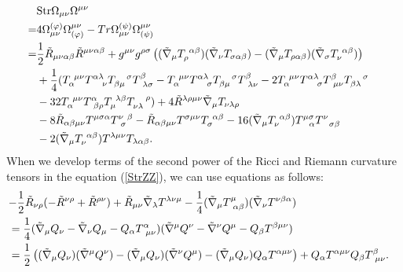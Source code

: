 \begin{align}
\lefteqn{{\rm Str}\Omega_{\mu\nu}\Omega^{\mu\nu}} \nonumber \\
= &
4\Omega^{(\varphi)}_{\mu\nu}\Omega_{(\varphi)}^{\mu\nu}-Tr \Omega_{\mu\nu}^{(\psi)}\Omega^{\mu\nu}_{(\psi)}
\nonumber \\
= & \frac{1}{2}\tilde{R}_{\mu\nu\alpha\beta}\tilde{R}^{\mu\nu\alpha\beta}
+g^{\mu\nu}g^{\rho\sigma}\left(
(\tilde{\nabla}_\mu T_\rho^{\ \alpha\beta})(\tilde{\nabla}_\nu T_{\sigma\alpha\beta})
-(\tilde{\nabla}_\mu T_{\rho\alpha\beta})(\tilde{\nabla}_\sigma T_\nu^{\ \alpha\beta})
\right)\nonumber \\
& +\frac{1}{4}(T_\alpha^{\ \mu\nu}T^{\alpha\lambda}_{\ \ \ \nu}T_{\beta\mu}^{\ \ \ \sigma}T^\beta_{\ \lambda\sigma}
-T_\alpha^{\ \mu\nu}T^{\alpha\lambda}_{\ \ \ \sigma}T_{\beta\mu}^{\ \ \ \sigma}T^\beta_{\ \lambda\nu}
-2T_\alpha^{\ \mu\nu}T^{\alpha\lambda}_{\ \ \ \sigma}T^\beta_{\ \mu\nu}T_{\beta\lambda}^{\ \ \ \sigma}
\nonumber \\
& -32T_\alpha^{\ \mu\nu}T^\alpha_{\ \beta\rho}T_\mu^{\ \lambda\beta}T_{\nu\lambda}^{\ \ \ \rho}
) 
+4\tilde{R}^{\lambda\rho\mu\nu}\tilde{\nabla}_\mu T_{\nu\lambda\rho}
\nonumber \\
& -8\tilde{R}_{\alpha\beta\mu\nu}T^{\mu\sigma\alpha}T_{\ \sigma}^{\nu\ \beta}
-\tilde{R}_{\alpha\beta\mu\nu}T^{\sigma\mu\nu}T_\sigma^{\ \alpha\beta}
-16(\tilde{\nabla}_\mu T_\nu^{\ \alpha\beta})T^{\mu\sigma}_{\ \ \alpha}T^\nu_{\ \ \sigma\beta}\nonumber \\
& -2(\tilde{\nabla}_\mu T_\nu^{\ \alpha\beta})T^{\lambda\mu\nu}T_{\lambda\alpha\beta}. \label{StrOmegaOmega}
\end{align}
When we develop terms of the second power of the Ricci and Riemann curvature tensors in the equation (\ref{StrZZ}), 
we can use equations as follows:
\begin{align}
\lefteqn{-\frac{1}{2}\tilde{R}_{\nu\rho}(-\tilde{R}^{\nu\rho}+\tilde{R}^{\rho\nu})+\tilde{R}_{\mu\nu}\tilde{\nabla}_\lambda
T^{\lambda\nu\mu}-\frac{1}{4}(\tilde{\nabla}_\mu T^\mu_{\ \alpha\beta})(\tilde{\nabla}_\nu T^{\nu\beta\alpha}) }\nonumber \\
& =  \frac{1}{4}(\tilde{\nabla}_\mu Q_\nu - \tilde{\nabla}_\nu Q_\mu-Q_\alpha T^\alpha_{\ \mu\nu})
(\tilde{\nabla}^\mu Q^\nu - \tilde{\nabla}^\nu Q^\mu-Q_\beta T^{\beta\mu\nu}) \nonumber \\
& = \frac{1}{2}\left((\tilde{\nabla}_\mu Q_\nu)(\tilde{\nabla}^\mu Q^\nu)-(\tilde{\nabla}_\mu Q_\nu)(\tilde{\nabla}^\nu Q^\mu) -(\tilde{\nabla}_\mu Q_\nu)Q_\alpha T^{\alpha\mu\nu}\right) 
+Q_\alpha T^{\alpha\mu\nu}Q_\beta T^\beta_{\ \mu\nu}.
\end{align}
